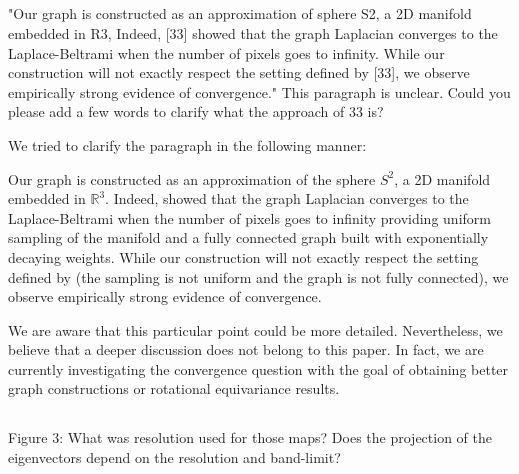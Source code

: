 \documentclass[12pt,a4paper]{article}
\newcommand{\todo}[1]{{\color[rgb]{.6,.1,.6}{TODO: #1}}}
\newcommand{\1}{\b{1}}              %
\newcommand{\0}{\b{0}}              %
\begin{document}
\todo{Assigned to: @all whoever can answer this question. I just do not know the answer.

We clarified the sentence with this:
\begin{mdframed}[style=manuscript] 
blabla
\end{mdframed}
}

\subsection{}
\begin{mdframed}[style=comment] 
"Our graph is constructed as an approximation of sphere S2, a 2D manifold embedded in R3, Indeed, [33] showed that the graph Laplacian converges to the Laplace-Beltrami when the number of pixels goes to infinity. While our construction will not exactly respect the setting defined by [33], we observe empirically strong evidence of convergence." This paragraph is unclear. Could you please add a few words to clarify what the approach of 33 is? 
\end{mdframed}

\todo{Assigned: @nati, @michael}

We tried to clarify the paragraph in the following manner:
\begin{mdframed}[style=manuscript] 
Our graph is constructed as an approximation of the sphere $S^2$, a 2D manifold embedded in $\mathbb{R}^3$.
Indeed, \cite{belkin2007convergence} showed that the graph Laplacian converges to the Laplace-Beltrami when the number of pixels goes to infinity providing uniform sampling of the manifold and a fully connected graph built with exponentially decaying weights.
While our construction will not exactly respect the setting defined by \cite{belkin2007convergence} (the sampling is not uniform and the graph is not fully connected), we observe empirically strong evidence of convergence.
\end{mdframed}
We are aware that this particular point could be more detailed. Nevertheless, we believe that a deeper discussion does not belong to this paper. In fact, we are currently investigating the convergence question with the goal of obtaining better graph constructions or rotational equivariance results.

\subsection{}

\begin{mdframed}[style=comment] 
Figure 3: What was resolution used for those maps? Does the projection of the eigenvectors depend on the resolution and band-limit? 
\end{mdframed}
\end{document}

